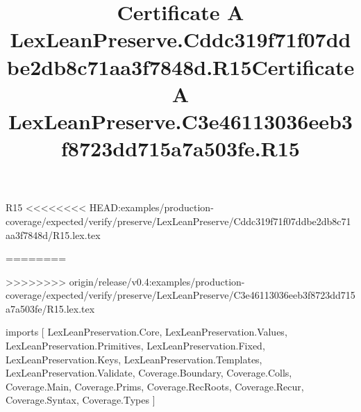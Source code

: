 \begin{lexlean}{R15}
<<<<<<<< HEAD:examples/production-coverage/expected/verify/preserve/LexLeanPreserve/Cddc319f71f07ddbe2db8c71aa3f7848d/R15.lex.tex
\title{Certificate A LexLeanPreserve.Cddc319f71f07ddbe2db8c71aa3f7848d.R15}
========
\title{Certificate A LexLeanPreserve.C3e46113036eeb3f8723dd715a7a503fe.R15}
>>>>>>>> origin/release/v0.4:examples/production-coverage/expected/verify/preserve/LexLeanPreserve/C3e46113036eeb3f8723dd715a7a503fe/R15.lex.tex
\begin{coremodule}
imports [
  LexLeanPreservation.Core,
  LexLeanPreservation.Values,
  LexLeanPreservation.Primitives,
  LexLeanPreservation.Fixed,
  LexLeanPreservation.Keys,
  LexLeanPreservation.Templates,
  LexLeanPreservation.Validate,
  Coverage.Boundary,
  Coverage.Colls,
  Coverage.Main,
  Coverage.Prims,
  Coverage.RecRoots,
  Coverage.Recur,
  Coverage.Syntax,
  Coverage.Types
]


\end{coremodule}
\end{lexlean}
